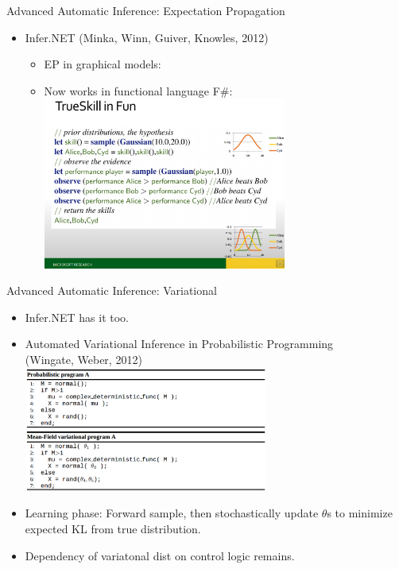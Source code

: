 \begin{frame}{Advanced Automatic Inference: Expectation Propagation}
    \begin{itemize}
      \item Infer.NET {\color{DarkBlue} (Minka, Winn, Guiver, Knowles, 2012)}
      \begin{itemize}
        \item EP in graphical models:
        \item Now works in functional language F\#:
        \includegraphics[width=8cm]{figures/fun}
      \end{itemize}
    \end{itemize}
    
\end{frame}

\begin{frame}{Advanced Automatic Inference: Variational}

    \begin{itemize}
      \item Infer.NET has it too.
      \item Automated Variational Inference in Probabilistic Programming
      \\ {\color{DarkBlue}  (Wingate, Weber, 2012) }
      \\\includegraphics[width=8cm]{figures/meanvar}
      \item Learning phase: Forward sample, then stochastically update $\theta$s to minimize expected KL from true distribution.
      \item Dependency of variatonal dist on control logic remains.
    \end{itemize}

\end{frame}


